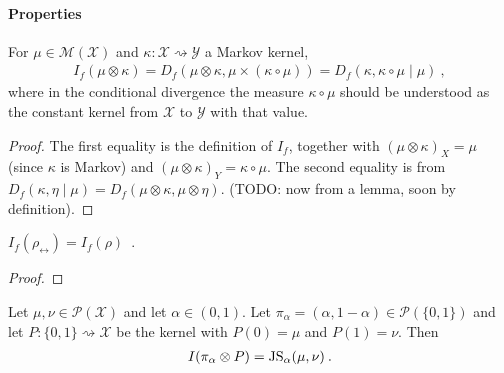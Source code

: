 \paragraph{Properties}

\begin{lemma}
  \label{lem:fMutualInfo_eq_condFDiv}
  For $\mu \in \mathcal M(\mathcal X)$ and $\kappa : \mathcal X \rightsquigarrow \mathcal Y$ a Markov kernel,
  \begin{align*}
  I_f(\mu \otimes \kappa)
  = D_f(\mu \otimes \kappa, \mu \times (\kappa \circ \mu))
  = D_f(\kappa, \kappa \circ \mu \mid \mu)
  \: ,
  \end{align*}
  where in the conditional divergence the measure $\kappa \circ \mu$ should be understood as the constant kernel from $\mathcal X$ to $\mathcal Y$ with that value.
\end{lemma}

\begin{proof}%
\uses{}
The first equality is the definition of $I_f$, together with $(\mu \otimes \kappa)_X = \mu$ (since $\kappa$ is Markov) and $(\mu \otimes \kappa)_Y = \kappa \circ \mu$.
The second equality is from $D_f(\kappa, \eta \mid \mu) = D_f(\mu \otimes \kappa, \mu \otimes \eta)$. (TODO: now from a lemma, soon by definition).
\end{proof}


\begin{lemma}
  \label{lem:fMutualInfo_symm}
  $I_f(\rho_\leftrightarrow) = I_f(\rho)$~.
\end{lemma}

\begin{proof}%
{}

\end{proof}


\begin{lemma}
  \label{lem:mutualInfo_eq_jensenShannon}
  Let $\mu, \nu \in \mathcal P(\mathcal X)$ and let $\alpha \in (0, 1)$. Let $\pi_\alpha = (\alpha, 1 - \alpha) \in \mathcal P(\{0,1\})$ and let $P : \{0,1\} \rightsquigarrow \mathcal X$ be the kernel with $P(0) = \mu$ and $P(1) = \nu$. Then
  \begin{align*}
  I(\pi_\alpha \otimes P) = \operatorname{JS}_\alpha(\mu, \nu) \: .
  \end{align*}
\end{lemma}

